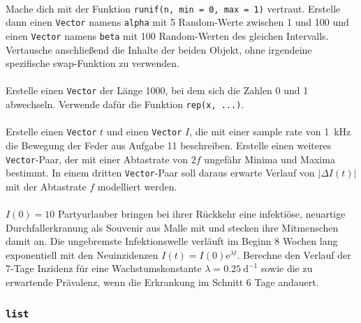 \documentclass[paper=A4, pagesize, DIV=calc, smallheadings,
fontsize=12pt, expansion=false]{scrreprt}
\begin{document}
\paragraph{}
Mache dich mit der Funktion \texttt{runif(n, min = 0, max = 1)} vertraut. Erstelle dann einen \texttt{Vector} 
namens \texttt{alpha} mit 5 
Random-Werte zwischen 1 und 100 und einen \texttt{Vector} namens \texttt{beta} mit 100 Random-Werten des gleichen 
Intervalls.
Vertausche anschließend die Inhalte der beiden Objekt, ohne irgendeine spezifische swap-Funktion zu verwenden.

\paragraph{}
Erstelle einen \texttt{Vector} der Länge 1000, bei dem sich die Zahlen 0 und 1 abwechseln. Verwende dafür die Funktion 
\texttt{rep(x, ...)}.

\paragraph{}
Erstelle einen \texttt{Vector} $t$ und einen \texttt{Vector} $I$, die mit einer sample rate von \SI{1}{kHz} die 
Bewegung der Feder aus Aufgabe 11 %
beschreiben.
Erstelle einen weiteres \texttt{Vector}-Paar, der mit einer Abtastrate von $2f$ ungefähr Minima und Maxima bestimmt.
In einem dritten \texttt{Vector}-Paar soll daraus erwarte Verlauf von $|\Delta I(t)|$ mit der Abtastrate $f$ modelliert 
werden.

\paragraph{}
$I(0) = 10$ Partyurlauber bringen bei ihrer Rückkehr eine infektiöse, neuartige Durchfallerkranung als Souvenir aus 
Malle mit 
und stecken ihre Mitmenschen damit an.
Die ungebremste Infektionswelle verläuft im Beginn 8 Wochen lang exponentiell mit den Neuinzidenzen $I(t) = I(0) 
\text{e}^{\lambda t}$.
Berechne den Verlauf der 7-Tage Inzidenz für eine Wachstumskonstante $\lambda = \SI{0.25}{\text{d}^{-1}}$ sowie die zu 
erwartende Prävalenz, wenn die Erkrankung im Schnitt 6 Tage andauert.

\subsubsection*{\texttt{\textbf{list}}}
\end{document}
